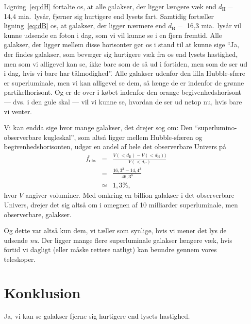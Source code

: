 \documentclass[useAMS,danish]{aa}
\begin{document}
Ligning~\ref{eq:dH} fortalte os, at alle galakser, der ligger længere væk end $d_\mathrm{H} =$ 14,4 mia.~lysår, fjerner sig hurtigere end lysets fart.
Samtidig fortæller ligning~\ref{eq:dB} os, at galakser, der ligger nærmere end $d_\mathrm{B} = $ 16,3 mia.~lysår vil kunne udsende en foton i dag, som vi vil kunne se i en fjern fremtid.
Alle galakser, der ligger mellem disse horisonter gør os i stand til at kunne sige ``Ja, der findes galakser, som bevæger sig hurtigere væk fra os end lysets hastighed, men som vi alligevel kan se, ikke bare som de så ud i fortiden, men som de ser ud i dag, hvis vi bare har tålmodighed''.
Alle galakser udenfor den lilla Hubble-sfære er superluminale, men vi kan alligevel se dem, så længe de er indenfor de grønne partikelhorisont.
Og er de over i købet indenfor den orange begivenhedshorisont --- dvs. i den gule skal --- vil vi kunne se, hvordan de ser ud netop nu, hvis bare vi venter.

Vi kan endda sige hvor mange galakser, det drejer sog om:
Den ``superlumino-observerbare kugleskal'', som altså ligger mellem Hubble-sfæren og begivenhedshorisonten, udgør en andel af hele det observerbare Univers på
\begin{eqnarray}
    \label{eq:fobs}
    \nonumber
    f_\mathrm{obs} & = & \frac{V(<d_\mathrm{B}) - V(<d_\mathrm{H}))}
                              {V(<d_\mathrm{P})}\\
                   & = & \frac{16,\!3^3 - 14,\!4^3}{46,\!3^3}\\
                   & \simeq & 1,\!3\%,
\end{eqnarray}
hvor $V$ angiver voluminer.
Med omkring en billion galakser i det observerbare Univers, drejer det sig altså om i omegnen af 10 milliarder superluminale, men observerbare, galakser.

Og dette var altså kun dem, vi tæller som synlige, hvis vi mener det lys de udsende \emph{nu}.
Der ligger mange flere superluminale galakser længere væk, hvis fortid vi dagligt (eller måske rettere natligt) kan beundre gennem vores teleskoper.

\section{Konklusion}
\label{sec:konklusion}

Ja, vi kan se galakser fjerne sig hurtigere end lysets hastighed.
\end{document}
